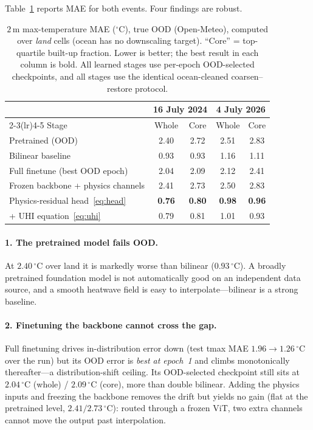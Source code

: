 \documentclass[11pt]{article}
\begin{document}
Table~\ref{tab:results} reports MAE for both events. Four findings are robust.

\begin{table}[t]
\centering
\caption{$2\,\mathrm{m}$ max-temperature MAE ($^\circ\mathrm{C}$), true OOD
(Open-Meteo), computed over \emph{land} cells (ocean has no downscaling target).
``Core'' = top-quartile built-up fraction. Lower is better; the best result in each
column is bold. All learned stages use per-epoch OOD-selected checkpoints, and all
stages use the identical ocean-cleaned coarsen--restore protocol.}
\label{tab:results}
\small
\begin{tabular}{lcccc}
\toprule
& \multicolumn{2}{c}{\textbf{16 July 2024}} & \multicolumn{2}{c}{\textbf{4 July 2026}} \\
\cmidrule(lr){2-3}\cmidrule(lr){4-5}
Stage & Whole & Core & Whole & Core \\
\midrule
Pretrained (OOD)                    & 2.40 & 2.72 & 2.51 & 2.83 \\
Bilinear baseline                   & 0.93 & 0.93 & 1.16 & 1.11 \\
Full finetune (best OOD epoch)      & 2.04 & 2.09 & 2.12 & 2.41 \\
Frozen backbone + physics channels  & 2.41 & 2.73 & 2.50 & 2.83 \\
Physics-residual head~\eqref{eq:head} & \textbf{0.76} & \textbf{0.80} & \textbf{0.98} & \textbf{0.96} \\
\;+ UHI equation~\eqref{eq:uhi}     & 0.79 & 0.81 & 1.01 & 0.93 \\
\bottomrule
\end{tabular}
\end{table}

\paragraph{1. The pretrained model fails OOD.} At $2.40\,^\circ\mathrm{C}$ over
land it is markedly worse than bilinear ($0.93\,^\circ\mathrm{C}$). A broadly
pretrained foundation model is not automatically good on an independent data
source, and a smooth heatwave field is easy to interpolate---bilinear is a strong
baseline.

\paragraph{2. Finetuning the backbone cannot cross the gap.} Full finetuning
drives in-distribution error down (test tmax MAE $1.96\!\to\!1.26\,^\circ\mathrm{C}$
over the run) but its OOD error is \emph{best at epoch~1} and climbs monotonically
thereafter---a distribution-shift ceiling. Its OOD-selected checkpoint still sits
at $2.04\,^\circ\mathrm{C}$ (whole) / $2.09\,^\circ\mathrm{C}$ (core), more than
double bilinear. Adding the physics inputs and freezing the backbone removes the
drift but yields no gain (flat at the pretrained level, $2.41/2.73\,^\circ\mathrm{C}$):
routed through a frozen ViT, two extra channels cannot move the output past
interpolation.
\end{document}
